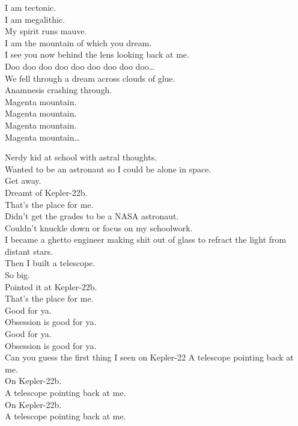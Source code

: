 I am tectonic. \\
I am megalithic. \\
My spirit runs mauve. \\
I am the mountain of which you dream. \\
I see you now behind the lens looking back at me. \\

Doo doo doo doo doo doo doo doo doo… \\
We fell through a dream across clouds of glue. \\
Anamnesis crashing through. \\

Magenta mountain. \\
Magenta mountain. \\
Magenta mountain. \\
Magenta mountain… \\




Nerdy kid at school with astral thoughts. \\
Wanted to be an astronaut so I could be alone in space. \\

Get away. \\
Dreamt of Kepler-22b. \\
That's the place for me. \\

Didn't get the grades to be a NASA astronaut. \\
Couldn't knuckle down or focus on my schoolwork. \\
I became a ghetto engineer making shit out of glass to refract the light from distant stars. \\
Then I built a telescope. \\
So big. \\
Pointed it at Kepler-22b. \\
That's the place for me. \\

Good for ya. \\
Obsession is good for ya. \\
Good for ya. \\
Obsession is good for ya. \\

Can you guess the first thing I seen on Kepler-22
A telescope pointing back at me. \\
On Kepler-22b. \\
A telescope pointing back at me. \\
On Kepler-22b. \\
A telescope pointing back at me. \\

